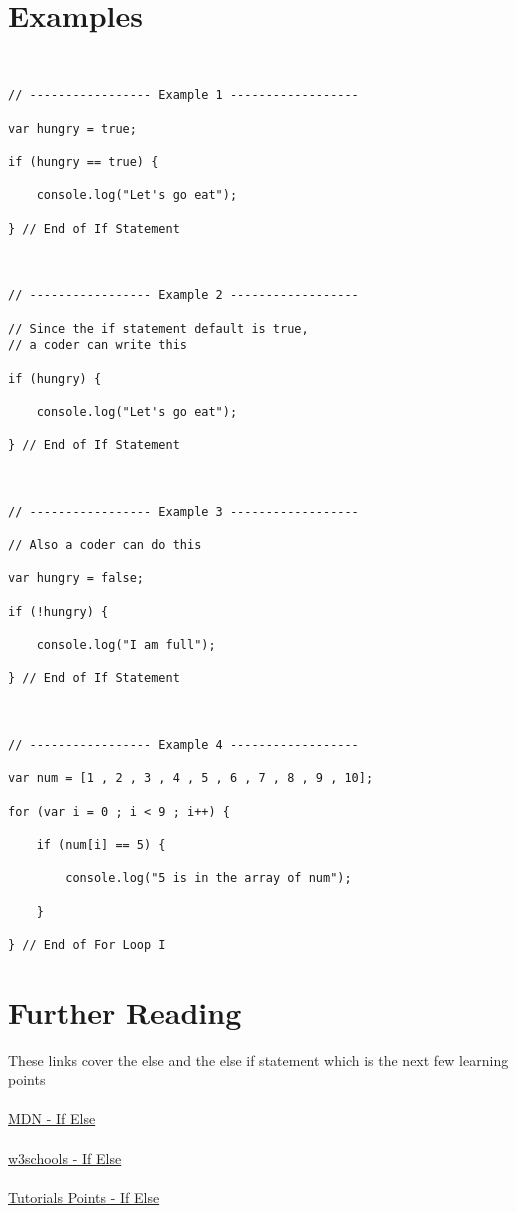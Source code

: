 \documentclass[12pt, letterpaper]{article}
\begin{document}
\section*{Examples}

\begin{lstlisting}


// ----------------- Example 1 ------------------

var hungry = true;

if (hungry == true) {

	console.log("Let's go eat");

} // End of If Statement



// ----------------- Example 2 ------------------

// Since the if statement default is true,
// a coder can write this

if (hungry) {

	console.log("Let's go eat");

} // End of If Statement



// ----------------- Example 3 ------------------

// Also a coder can do this

var hungry = false;

if (!hungry) {

	console.log("I am full");

} // End of If Statement



// ----------------- Example 4 ------------------

var num = [1 , 2 , 3 , 4 , 5 , 6 , 7 , 8 , 9 , 10];

for (var i = 0 ; i < 9 ; i++) {

	if (num[i] == 5) {

		console.log("5 is in the array of num");
	
	}

} // End of For Loop I

\end{lstlisting}

\section*{Further Reading}

These links cover the else and the else if statement which is the next few learning points\\
\\
\href{https://developer.mozilla.org/en-US/docs/Web/JavaScript/Reference/Statements/if...else}{MDN - If Else}\\
\\
\href{http://www.w3schools.com/js/js_if_else.asp}{w3schools - If Else}\\
\\
\href{https://www.tutorialspoint.com/javascript/javascript_ifelse.htm}{Tutorials Points - If Else}
\end{document}
